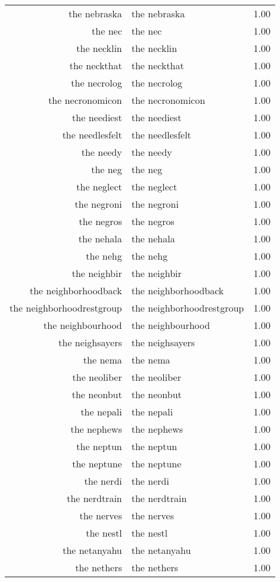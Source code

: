 \begin{table}[ht]
\begin{tabular}{rlr}
  the nebraska & the nebraska & 1.00 \\ 
  the nec & the nec & 1.00 \\ 
  the necklin & the necklin & 1.00 \\ 
  the neckthat & the neckthat & 1.00 \\ 
  the necrolog & the necrolog & 1.00 \\ 
  the necronomicon & the necronomicon & 1.00 \\ 
  the neediest & the neediest & 1.00 \\ 
  the needlesfelt & the needlesfelt & 1.00 \\ 
  the needy & the needy & 1.00 \\ 
  the neg & the neg & 1.00 \\ 
  the neglect & the neglect & 1.00 \\ 
  the negroni & the negroni & 1.00 \\ 
  the negros & the negros & 1.00 \\ 
  the nehala & the nehala & 1.00 \\ 
  the nehg & the nehg & 1.00 \\ 
  the neighbir & the neighbir & 1.00 \\ 
  the neighborhoodback & the neighborhoodback & 1.00 \\ 
  the neighborhoodrestgroup & the neighborhoodrestgroup & 1.00 \\ 
  the neighbourhood & the neighbourhood & 1.00 \\ 
  the neighsayers & the neighsayers & 1.00 \\ 
  the nema & the nema & 1.00 \\ 
  the neoliber & the neoliber & 1.00 \\ 
  the neonbut & the neonbut & 1.00 \\ 
  the nepali & the nepali & 1.00 \\ 
  the nephews & the nephews & 1.00 \\ 
  the neptun & the neptun & 1.00 \\ 
  the neptune & the neptune & 1.00 \\ 
  the nerdi & the nerdi & 1.00 \\ 
  the nerdtrain & the nerdtrain & 1.00 \\ 
  the nerves & the nerves & 1.00 \\ 
  the nestl & the nestl & 1.00 \\ 
  the netanyahu & the netanyahu & 1.00 \\ 
  the nethers & the nethers & 1.00 \\ 

\end{tabular}
\end{table}
